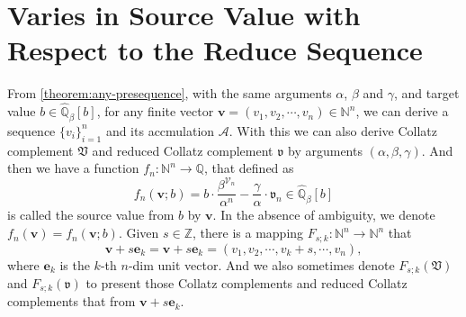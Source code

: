 \section{Varies in Source Value with Respect to the Reduce Sequence}\label{sec:varies-in-source-value-with-respect-to-the-reduce-sequence}

\begin{definition}
From \cref{theorem:any-presequence}, with the same arguments $\alpha$, $\beta$ and $\gamma$, and target value $b\in \widehat{\mathbb{Q}}_{{\beta}}[b]$, for any finite vector $\bm{v} = (v_{1}, v_{2}, \cdots, v_{n}) \in \mathbb{N}^{n}$, we can derive a sequence $\{v_i\}_{i=1}^{n}$ and its accmulation $\mathcal{A}$. With this we can also derive Collatz complement $\mathfrak{V}$ and reduced Collatz complement $\mathfrak{v}$ by arguments $(\alpha, \beta, \gamma)$. And then we have a function $f_n : \mathbb{N}^{n} \to \mathbb{Q}$, that defined as
\[ f_{n}(\bm{v};b) = b \cdot \frac{\beta^{\mathcal{V}_{n}}}{\alpha^{n}} - \frac{\gamma}{\alpha}\cdot \mathfrak{v}_{n} \in \widehat{\mathbb{Q}}_{{\beta}}[b] \]
is called the source value from $b$ by $\bm{v}$. In the absence of ambiguity, we denote $f_{n}(\bm{v}) = f_{n}(\bm{v};b)$. Given $s \in \mathbb{Z}$, there is a mapping $F_{s; k}: \mathbb{N}^{n} \to \mathbb{N}^{n}$ that
\[ \bm{v}+s\bm{e}_{k} = \bm{v} + s\bm{e}_k = (v_{1}, v_{2}, \cdots,v_{k} + s, \cdots, v_{n}), \]
where $\bm{e}_k$ is the $k$-th $n$-dim unit vector.
And we also sometimes denote $F_{s; k}(\mathfrak{V})$ and $F_{s; k}(\mathfrak{v})$ to present those Collatz complements and reduced Collatz complements that from $\bm{v}+s\bm{e}_{k}$.
\end{definition}

